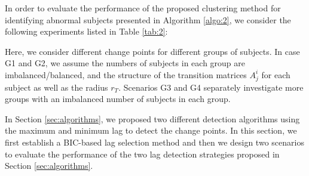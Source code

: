 \documentclass[11pt]{article}
\begin{document}
In order to evaluate the performance of the proposed clustering method for identifying abnormal subjects presented in Algorithm \ref{algo:2}, we consider the following experiments listed in Table \ref{tab:2}:
\begin{table}[!ht]
    \centering
    \caption{Model parameters settings for multiple groups cases.}
    \label{tab:2}
\end{table}

Here, we consider different change points for different groups of subjects. In case G1 and G2, we assume the numbers of subjects in each group are imbalanced/balanced, and the structure of the transition matrices $A_j^i$ for each subject as well as the radius $r_T$. Scenarios G3 and G4 separately investigate more groups with an imbalanced number of subjects in each group. 

In Section \ref{sec:algorithms}, we proposed two different detection algorithms using the maximum and minimum lag to detect the change points. In this section, we first establish a BIC-based lag selection method and then we design two scenarios to evaluate the performance of the two lag detection strategies proposed in Section \ref{sec:algorithms}. 
\end{document}
